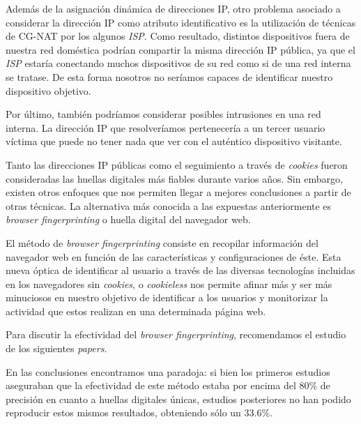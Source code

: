 Además de la asignación dinámica de direcciones IP, otro problema asociado a considerar la dirección IP como atributo identificativo es la utilización de técnicas de CG-NAT por los algunos \textit{ISP}. Como resultado, distintos dispositivos fuera de nuestra red doméstica podrían compartir la misma dirección IP pública, ya que el \textit{ISP} estaría conectando muchos dispositivos de su red como si de una red interna se tratase. De esta forma nosotros no seríamos capaces de identificar nuestro dispositivo objetivo. \par

Por último, también podríamos considerar posibles intrusiones en una red interna. La dirección IP que resolveríamos pertenecería a un tercer usuario víctima que puede no tener nada que ver con el auténtico dispositivo visitante.  \par

Tanto las direcciones IP públicas como el seguimiento a través de \textit{cookies} fueron consideradas las huellas digitales más fiables durante varios años. Sin embargo, existen otros enfoques que nos permiten llegar a mejores conclusiones a partir de otras técnicas. La alternativa más conocida a las expuestas anteriormente es \textit{browser fingerprinting} o huella digital del navegador web. \par

El método de \textit{browser fingerprinting}\cite{fingerprint} consiste en recopilar información del navegador web en función de las características y configuraciones de éste. Esta nueva óptica de identificar al usuario a través de las diversas tecnologías incluidas en los navegadores sin \textit{cookies}, o \textit{cookieless}\cite{cookieless} nos permite afinar más y ser más minuciosos en nuestro objetivo de identificar a los usuarios y monitorizar la actividad que estos realizan en una determinada página web. \par 

Para discutir la efectividad del \textit{browser fingerprinting}, recomendamos el estudio de los siguientes \textit{papers}\cite{panop_paper, javascript_paper, effective_paper}. \par 

En las conclusiones encontramos una paradoja: si bien los primeros estudios aseguraban que la efectividad de este método estaba por encima del 80\% de precisión en cuanto a huellas digitales únicas\cite{panop_paper, javascript_paper}, estudios posteriores no han podido reproducir estos mismos resultados, obteniendo sólo un 33.6\%\cite{effective_paper}. \par

